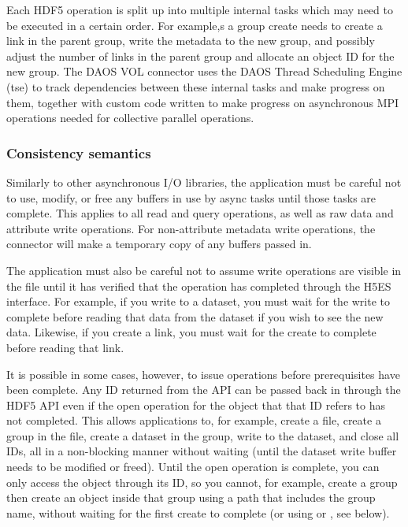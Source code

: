 \documentclass[../users_guide.tex]{subfiles}
\begin{document}
Each HDF5 operation is split up into multiple internal tasks which may need to
be executed in a certain order. For example,s a group create needs to create a
link in the parent group, write the metadata to the new group, and possibly
adjust the number of links in the parent group and allocate an object ID for the
new group. The DAOS VOL connector uses the DAOS Thread Scheduling Engine (tse)
to track dependencies between these internal tasks and make progress on them,
together with custom code written to make progress on asynchronous MPI
operations needed for collective parallel operations.

\subsubsection {Consistency semantics}

Similarly to other asynchronous I/O libraries, the application must be careful
not to use, modify, or free any buffers in use by async tasks until those tasks
are complete. This applies to all read and query operations, as well as raw data
and attribute write operations.  For non-attribute metadata write operations,
the connector will make a temporary copy of any buffers passed in.

The application must also be careful not to assume write operations are visible
in the file until it has verified that the operation has completed through the
H5ES interface. For example, if you write to a dataset, you must wait for the
write to complete before reading that data from the dataset if you wish to see
the new data. Likewise, if you create a link, you must wait for the create to
complete before reading that link.

It is possible in some cases, however, to issue operations before prerequisites
have been complete. Any ID returned from the API can be passed back in through
the HDF5 API even if the open operation for the object that that ID refers to
has not completed. This allows applications to, for example, create a file,
create a group in the file, create a dataset in the group, write to the dataset,
and close all IDs, all in a non-blocking manner without waiting (until the
dataset write buffer needs to be modified or freed). Until the open operation is
complete, you can only access the object through its ID, so you cannot, for
example, create a group then create an object inside that group using a path
that includes the group name, without waiting for the first create to complete
(or using  or , see
below).
\end{document}
